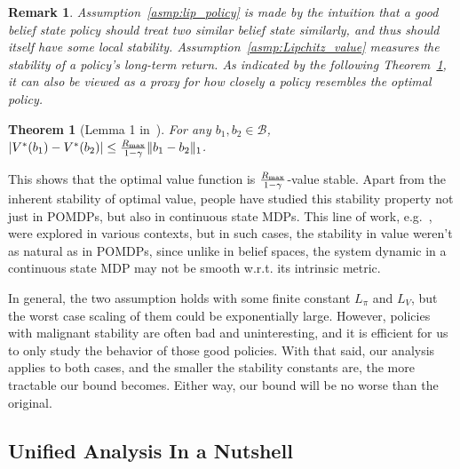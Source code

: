 \documentclass[twoside]{article}
\newtheorem{theorem}{Theorem}
\newtheorem{remark}{Remark}
\newcommand{\CAL}[1]{\mathcal{#1}}
\begin{document}
\begin{remark}
    Assumption~\ref{asmp:lip_policy} is made by the intuition that a good belief state policy should treat two similar belief state similarly, and thus should itself have some local stability. Assumption~\ref{asmp:Lipchitz_value} measures the stability of a policy's long-term return. As indicated by the following Theorem~\ref{Thm:lip_optimal_value}, it can also be viewed as a proxy for how closely a policy resembles the optimal policy.
\end{remark}
\begin{theorem}[Lemma 1 in~\cite{lee2007makes}]\label{Thm:lip_optimal_value}
    For any $b_1,b_2\in\CAL{B}$, $|V^*(b_1)-V^*(b_2)|\leq\frac{R_{\rm max}}{1-\gamma}\|b_1-b_2\|_1$.
\end{theorem}
This shows that the optimal value function is $\frac{R_{\rm max}}{1-\gamma}$-value stable. Apart from the inherent stability of optimal value, people have studied this stability property not just in POMDPs, but also in continuous state MDPs. This line of work, e.g.~\cite{pirotta2015policy,asadi2018lipschitz,gelada2019deepmdp}, were explored in various contexts, but in such cases, the stability in value weren't as natural as in POMDPs, since unlike in belief spaces, the system dynamic in a continuous state MDP may not be smooth w.r.t. its intrinsic metric.

In general, the two assumption holds with some finite constant $L_\pi$ and $L_V$, but the worst case scaling of them could be exponentially large. However, policies with malignant stability are often bad and uninteresting, and it is efficient for us to only study the behavior of those good policies. With that said, our analysis applies to both cases, and the smaller the stability constants are, the more tractable our bound becomes. Either way, our bound will be no worse than the original.


\subsection{Unified Analysis In a Nutshell}
\end{document}
